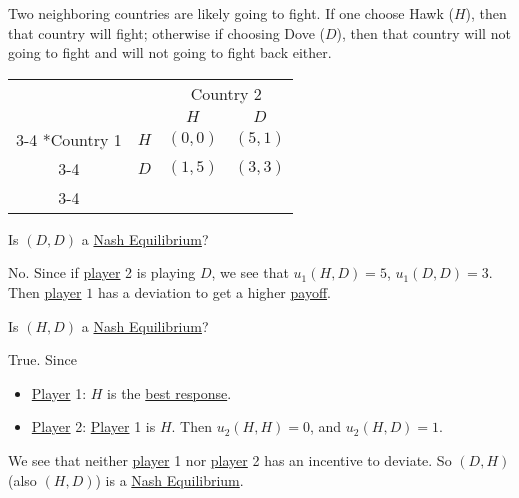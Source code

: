 \begin{eg}\label{def:Hawk-Dove}
	Two neighboring countries are likely going to fight. If one choose Hawk (\(H\)), then that country will fight; otherwise if choosing Dove (\(D\)), then that country will not
	going to fight and will not going to fight back either.
	\begin{table}[H]
		\centering
		\setlength{\extrarowheight}{2pt}
		\begin{tabular}{cc|c|c|}
			                         & \multicolumn{1}{c}{} & \multicolumn{2}{c}{Country 2}                           \\
			                         & \multicolumn{1}{c}{} & \multicolumn{1}{c}{$H$}       & \multicolumn{1}{c}{$D$} \\\cline{3-4}
			\multirow{2}*{Country 1} & $H$                  & $(0, 0)$                      & $(5, 1)$                \\\cline{3-4}
			                         & $D$                  & $(1, 5)$                      & $(3, 3)$                \\\cline{3-4}
		\end{tabular}
	\end{table}
	\begin{problem}
	Is \((D, D)\) a \hyperref[def:Nash-equilibrium]{Nash Equilibrium}?
	\end{problem}
	\begin{answer}
		No. Since if \hyperref[def:player]{player} 2 is playing \(D\), we see that \(u_1(H, D) = 5\), \(u_1(D, D) = 3\). Then \hyperref[def:player]{player} \(1\) has a
		deviation to get a higher \hyperref[def:reward]{payoff}.
	\end{answer}
	\begin{problem}
	Is \((H, D)\) a \hyperref[def:Nash-equilibrium]{Nash Equilibrium}?
	\end{problem}
	\begin{answer}
		True. Since
		\begin{itemize}
			\item \hyperref[def:player]{Player} 1: \(H\) is the \hyperref[def:best-response]{best response}.
			\item \hyperref[def:player]{Player} 2: \hyperref[def:player]{Player} 1 is \(H\). Then \(u_2(H, H) = 0\), and \(u_2(H, D) = 1\).
		\end{itemize}
		We see that neither \hyperref[def:player]{player} 1 nor \hyperref[def:player]{player} 2 has an incentive to deviate. So \((D, H)\) (also \((H, D)\)) is a
		\hyperref[def:Nash-equilibrium]{Nash Equilibrium}.
	\end{answer}
\end{eg}

